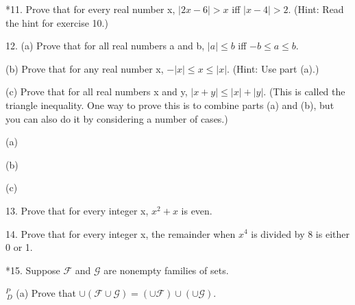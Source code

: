 \documentclass{article}
\begin{document}
\vspace{30pt}



\vspace{30pt}

*11. Prove that for every real number x, $|2x - 6| > x$ iff $|x - 4| > 2$. (Hint: Read the hint for exercise 10.)

\vspace{30pt}



\vspace{30pt}

12. (a) Prove that for all real numbers a and b, $|a| \leq b$ iff $-b \leq a \leq b$.

\hspace{12pt}(b) Prove that for any real number x, $-|x| \leq x \leq |x|$. (Hint: Use part (a).)

\hspace{12pt}(c) Prove that for all real numbers x and y, $|x + y| \leq |x| + |y|$. (This is called the triangle inequality. One way to prove this is to combine parts (a) and (b), but you can also do it by considering a number of
cases.)

\vspace{30pt}

(a)

\vspace{30pt}

(b)

\vspace{30pt}

(c)

\vspace{30pt}

13. Prove that for every integer x, $x^2 + x$ is even.

\vspace{30pt}



\vspace{30pt}

14. Prove that for every integer x, the remainder when $x^4$ is divided by 8 is either 0 or 1.

\vspace{30pt}



\vspace{30pt}

*15. Suppose $\mathcal{F}$ and $\mathcal{G}$ are nonempty families of sets.

\hspace{12pt}$^{\textit{P}}_{\, \textit{D}}$ (a) Prove that $\cup(\mathcal{F} \cup \mathcal{G}) = (\cup\mathcal{F}) \cup (\cup\mathcal{G})$.
\end{document}
